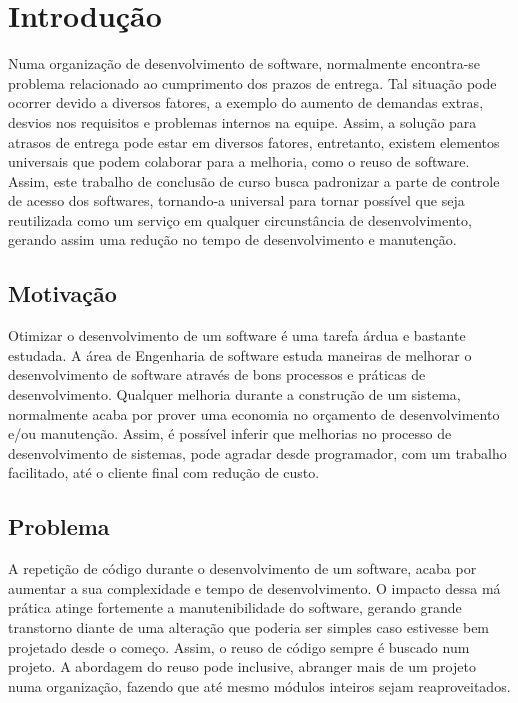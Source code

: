 \chapter{Introdução}


Numa organização de desenvolvimento de software, normalmente encontra-se problema relacionado ao cumprimento dos prazos de entrega. Tal situação pode ocorrer devido a diversos fatores, a exemplo do aumento de demandas extras, desvios nos requisitos e problemas internos na equipe. Assim, a solução para atrasos de entrega pode estar em diversos fatores, entretanto, existem elementos universais que podem colaborar para a melhoria, como o reuso de software. Assim, este trabalho de conclusão de curso busca padronizar a parte de controle de acesso dos softwares, tornando-a universal para tornar possível que seja reutilizada como um serviço em qualquer circunstância de desenvolvimento, gerando assim uma redução no tempo de desenvolvimento e manutenção.


\section{Motivação}


Otimizar o desenvolvimento de um software é uma tarefa árdua e bastante estudada. A área de Engenharia de software estuda maneiras de melhorar o desenvolvimento de software através de bons processos e práticas de desenvolvimento. Qualquer melhoria durante a construção de um sistema, normalmente acaba por prover uma economia no orçamento de desenvolvimento e/ou manutenção. Assim, é possível inferir que melhorias no processo de desenvolvimento de sistemas, pode agradar desde programador, com um trabalho facilitado, até o cliente final com redução de custo.


\section{Problema} %


A repetição de código durante o desenvolvimento de um software, acaba por aumentar a sua complexidade e tempo de desenvolvimento. O impacto dessa má prática atinge fortemente a manutenibilidade do software, gerando grande transtorno diante de uma alteração que poderia ser simples caso estivesse bem projetado desde o começo. Assim, o reuso de código sempre é buscado num projeto. A abordagem do reuso pode inclusive, abranger mais de um projeto numa organização, fazendo que até mesmo módulos inteiros sejam reaproveitados. 



